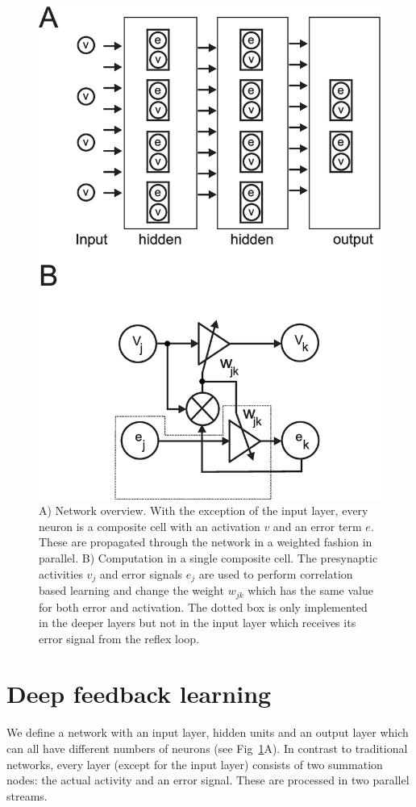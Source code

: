 \documentclass{aamas2018}
\begin{document}
\begin{figure}[!ht]
  \centering
  \includegraphics[width=0.75\columnwidth]{netw_together}
  \caption{A) Network overview. With the exception of the input layer, every
    neuron is a composite cell with an activation $v$ and an error
    term $e$. These are propagated through the network in a weighted
    fashion in parallel.  B) Computation in a single composite cell.
    The presynaptic activities $v_j$ and error signals $e_j$ are used
    to perform correlation based learning and change the weight
    $w_{jk}$ which has the same value for both error and activation.
    The dotted box is only implemented in the deeper layers but not
    in the input layer which receives its error signal from the reflex loop.
    \label{netw_together}}
\end{figure}


\section{Deep feedback learning}
We define a network with an input layer, hidden units and an output
layer which can all have different numbers of neurons (see
Fig~\ref{netw_together}A). In contrast to traditional
networks, every layer (except for the input layer) consists of two
summation nodes: the actual activity and an error signal. These
are processed in two parallel streams.
\end{document}
